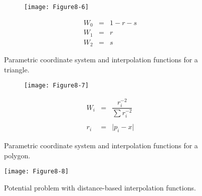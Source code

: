 \begin{figure}[!htb]
	\centering
	\begin{subfigure}{0.48\linewidth}
		\centering
		\texttt{[image: Figure8-6]}
		\caption*{}
	\end{subfigure}
	\hfill
	\begin{subfigure}{0.48\linewidth}
		\centering
		\begin{equation*}
		\begin{array}{lll}
		W_0 &=& 1 - r - s \\
		W_1 &=& r \\
		W_2 &=& s 	
		\end{array}
		\end{equation*}
	\end{subfigure}%
	\caption{Parametric coordinate system and interpolation functions for a triangle.}
	\label{fig:Figure8-6}
\end{figure}

\begin{figure}[!htb]
	\centering
	\begin{subfigure}{0.48\linewidth}
		\centering
		\texttt{[image: Figure8-7]}
		\caption*{}
	\end{subfigure}
	\hfill
	\begin{subfigure}{0.48\linewidth}
		\centering
		\begin{equation*}
		\begin{array}{lll}
		W_i &=& \dfrac{r_i^{-2}}{\sum r_i^{-2}} \\ \\
		r_i &=& \vert p_i - x \vert	
		\end{array}
		\end{equation*}
	\end{subfigure}%
	\caption{Parametric coordinate system and interpolation functions for a polygon.}
	\label{fig:Figure8-7}
\end{figure}

\begin{figure}[!htb]
	\centering
	\texttt{[image: Figure8-8]}\\
	\caption{Potential problem with distance-based interpolation functions.}\label{fig:Figure8-8}
\end{figure}

